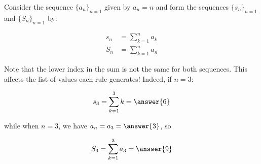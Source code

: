 \documentclass{ximera}
\author{Jim Talamo}
\begin{document}
\begin{exercise}

Consider the sequence $\{a_n\}_{n=1}$ given by $a_n = n$ and form the sequences $\{s_n\}_{n=1}$ and $\{S_n\}_{n=1}$ by:

\begin{align*}
s_n &= \sum_{k=1}^n a_k \\
S_n &= \sum_{k=1}^n a_n
\end{align*}

\begin{multipleChoice}
\end{multipleChoice}

Note that the lower index in the sum is not the same for both sequences. This affects the list of values each rule generates!  Indeed, if $n=3$:

\[
s_3 = \sum_{k=1}^3 k = \answer{6}
\]

while when $n=3$, we have $a_n=a_3= \answer{3}$, so

\[
S_3 = \sum_{k=1}^{3} a_3  = \answer{9}
\]


\end{exercise}
\end{document}
